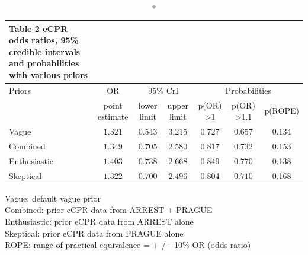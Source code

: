 \documentclass[
  super,
  preprint,
  3p]{elsarticle}
\begin{document}
\setlength{\LTpost}{0mm}
\begin{longtable}{lcccccc}
\caption*{
{\large Table 2 eCPR odds ratios, 95\% credible intervals and probabilities with various priors}
} \\ 
\toprule
Priors & OR & \multicolumn{2}{c}{95\% CrI} & \multicolumn{3}{c}{Probabilities} \\ 
\cmidrule(lr){1-1} \cmidrule(lr){2-2} \cmidrule(lr){3-4} \cmidrule(lr){5-7}
 & point estimate & lower limit & upper limit & p(OR) >1  & p(OR) >1.1  &  p(ROPE) \\ 
\midrule
Vague & $1.321$ & $0.543$ & $3.215$ & 0.727 & $0.657$ & 0.134 \\ 
Combined & $1.349$ & $0.705$ & $2.580$ & 0.817 & $0.732$ & 0.153 \\ 
Enthusiastic & $1.403$ & $0.738$ & $2.668$ & 0.849 & $0.770$ & 0.138 \\ 
Skeptical & $1.322$ & $0.700$ & $2.496$ & 0.804 & $0.710$ & 0.168 \\ 
\bottomrule
\end{longtable}
\begin{minipage}{\linewidth}
Vague: default vague prior\\
Combined: prior eCPR data from ARREST + PRAGUE\\
Enthusiastic: prior eCPR data from ARREST alone\\
Skeptical: prior eCPR data from PRAGUE alone\\
ROPE: range of practical equivalence = + / - 10\% OR (odds ratio)\\
\end{minipage}
\end{document}

